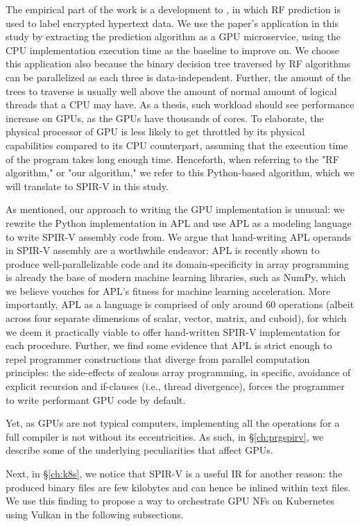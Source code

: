 \documentclass{IEEEtran}
\begin{document}
The empirical part of the work is a development to \cite{brissaud2019transparent}, in which \gls{RF} prediction is used to label encrypted hypertext data. We use the paper's application in this study by extracting the prediction algorithm as a GPU microservice, using the CPU implementation execution time as the baseline to improve on. We choose this application also because the binary decision tree traversed by \gls{RF} algorithms can be parallelized as each three is data-independent. Further, the amount of the trees to traverse is usually well above the amount of normal amount of logical threads that a CPU may have. As a thesis, such workload should see performance increase on GPUs, as the GPUs have thousands of cores. To elaborate, the physical processor of GPU is less likely to get throttled by its physical capabilities compared to its CPU counterpart, assuming that the execution time of the program takes long enough time. Henceforth, when referring to the "RF algorithm," or "our algorithm," we refer to this Python-based algorithm, which we will translate to SPIR-V in this study.

As mentioned, our approach to writing the GPU implementation is unusual: we rewrite the Python implementation in APL and use APL as a modeling language to write SPIR-V assembly code from. We argue that hand-writing APL operands in SPIR-V assembly are a worthwhile endeavor: APL is recently shown to produce well-parallelizable code \cite{hsu2016key} and its domain-specificity in array programming is already the base of modern machine learning libraries, such as NumPy, which we believe vouches for APL's fitness for machine learning acceleration. More importantly, APL as a language is comprised of only around 60 operations (albeit across four separate dimensions of scalar, vector, matrix, and cuboid), for which we deem it practically viable to offer hand-written SPIR-V implementation for each procedure. Further, we find some evidence that APL is strict enough to repel programmer constructions that diverge from parallel computation principles: the side-effects of zealous array programming, in specific, avoidance of explicit recursion and if-clauses (i.e., thread divergence), forces the programmer to write performant GPU code by default.

Yet, as GPUs are not typical computers, implementing all the operations for a full compiler is not without its eccentricities. As such, in §\ref{ch:prgspirv}, we describe some of the underlying peculiarities that affect GPUs.

Next, in §\ref{ch:k8s}, we notice that SPIR-V is a useful IR for another reason: the produced binary files are few kilobytes and can hence be inlined within text files. We use this finding to propose a way to orchestrate GPU \glspl{NF} on Kubernetes using Vulkan in the following subsections. 
\end{document}
